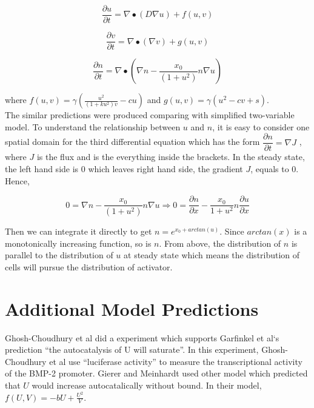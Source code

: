 \documentclass[12pt]{article}
\begin{document}
\begin{equation*}
\frac{\partial u}{\partial t}=\nabla \bullet (D\nabla u) + f(u,v)   
\end{equation*}

\begin{equation*}
\frac{\partial v}{\partial t}=\nabla \bullet (\nabla v) + g(u,v)  
\end{equation*}

\begin{equation*}
\frac{\partial n}{\partial t}=\nabla \bullet (\nabla n-\frac{x_0}{(1+u^2)}n \nabla u)
\end{equation*}

where $ f(u,v)=\gamma (\frac{u^2}{(1+ku^2)v}-cu)$ and $g(u,v)=\gamma (u^2-cv+s)$.\\


The similar predictions were produced comparing with simplified two-variable model.
To understand the relationship between $u$ and $n$, it is easy to consider one spatial domain for the third differential equation which has the form $\dfrac{\partial n}{\partial t}=\nabla J$ , where $J$ is the flux and is the everything inside the brackets. In the steady state, the left hand side is 0 which leaves right hand side, the gradient $J$, equals to 0. Hence,

\begin{equation*}
0=\nabla n -\frac{x_0}{(1+u^2)}n\nabla u \Rightarrow 0=\frac{\partial n}{\partial x} - \frac{x_0}{1+u^2}n\frac{\partial u}{\partial x}
\end{equation*}

Then we can integrate it directly to get $n=e^{x_0 + arctan(u)} $. Since $arctan(x)$ is a monotonically increasing function, so is $n$. From above, the distribution of $n$ is parallel to the distribution of $u$ at steady state which means the distribution of cells will pursue the distribution of activator.

\section{Additional Model Predictions}
Ghosh-Choudhury et al did a experiment which supports Garfinkel et al‘s prediction “the autocatalysis of U will saturate”. In this experiment, Ghosh-Choudhury et al  use “luciferase activity” to measure the transcriptional activity of the BMP-2 promoter. Gierer and Meinhardt used other model which predicted that $U$ would increase autocatalically without bound. In their model, $f(U,V)=-bU+\frac{U^2}{V}$.
\end{document}
